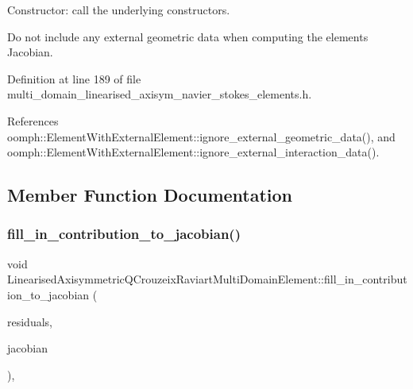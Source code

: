 Constructor\+: call the underlying constructors. 

Do not include any external geometric data when computing the element\textquotesingle{}s Jacobian. 

Definition at line 189 of file multi\+\_\+domain\+\_\+linearised\+\_\+axisym\+\_\+navier\+\_\+stokes\+\_\+elements.\+h.



References oomph\+::\+Element\+With\+External\+Element\+::ignore\+\_\+external\+\_\+geometric\+\_\+data(), and oomph\+::\+Element\+With\+External\+Element\+::ignore\+\_\+external\+\_\+interaction\+\_\+data().



\subsection{Member Function Documentation}
\mbox{\label{classLinearisedAxisymmetricQCrouzeixRaviartMultiDomainElement_a3920198ff369a194c7d0ca4628af1a8c}} 
\subsubsection{\texorpdfstring{fill\+\_\+in\+\_\+contribution\+\_\+to\+\_\+jacobian()}{fill\_in\_contribution\_to\_jacobian()}}
{\footnotesize\ttfamily void Linearised\+Axisymmetric\+Q\+Crouzeix\+Raviart\+Multi\+Domain\+Element\+::fill\+\_\+in\+\_\+contribution\+\_\+to\+\_\+jacobian (\begin{DoxyParamCaption}\item[{\hyperlink{classoomph_1_1Vector}{Vector}$<$ double $>$ \&}]{residuals,  }\item[{\hyperlink{classoomph_1_1DenseMatrix}{Dense\+Matrix}$<$ double $>$ \&}]{jacobian }\end{DoxyParamCaption})\hspace{0.3cm}{\ttfamily [inline]}, {\ttfamily [virtual]}}



